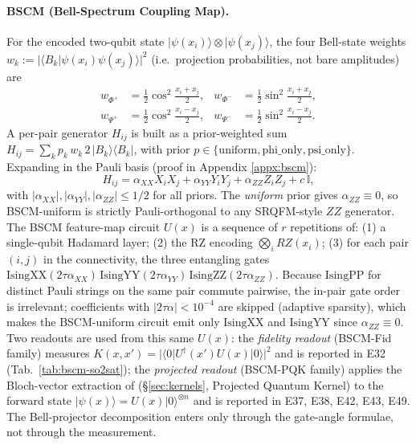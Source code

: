 \documentclass[pdflatex,sn-mathphys]{sn-jnl}
\theoremstyle{plain}
\theoremstyle{remark}
\theoremstyle{definition}
\begin{document}
\paragraph{BSCM (Bell-Spectrum Coupling Map).}\label{sec:bscm}
For the encoded two-qubit state $|\psi(x_i)\rangle\!\otimes\!|\psi(x_j)\rangle$, the four Bell-state weights $w_k := |\langle B_k | \psi(x_i)\psi(x_j)\rangle|^2$ (i.e.\ projection probabilities, not bare amplitudes) are
\begin{align*}
w_{\Phi^+}&=\tfrac12\cos^2\!\tfrac{x_i+x_j}{2}, &
w_{\Phi^-}&=\tfrac12\sin^2\!\tfrac{x_i+x_j}{2},\\
w_{\Psi^+}&=\tfrac12\cos^2\!\tfrac{x_i-x_j}{2}, &
w_{\Psi^-}&=\tfrac12\sin^2\!\tfrac{x_i-x_j}{2}.
\end{align*}
A per-pair generator $H_{ij}$ is built as a prior-weighted sum $H_{ij}=\sum_k p_k\,w_k\,2\,|B_k\rangle\!\langle B_k|$, with prior $p\in\{\text{uniform},\text{phi\_only},\text{psi\_only}\}$. Expanding in the Pauli basis (proof in Appendix \ref{appx:bscm}):
\begin{equation}\label{eq:pauli}
H_{ij} = \alpha_{XX}X_iX_j + \alpha_{YY}Y_iY_j + \alpha_{ZZ}Z_iZ_j + c\,\mathbb{I},
\end{equation}
with $|\alpha_{XX}|,|\alpha_{YY}|,|\alpha_{ZZ}|\le 1/2$ for all priors. The \emph{uniform} prior gives $\alpha_{ZZ}\!\equiv\!0$, so BSCM-uniform is strictly Pauli-orthogonal to any SRQFM-style $ZZ$ generator.
The BSCM feature-map circuit $U(x)$ is a sequence of $r$ repetitions of: (1) a single-qubit Hadamard layer; (2) the RZ encoding $\bigotimes_i RZ(x_i)$; (3) for each pair $(i,j)$ in the connectivity, the three entangling gates $\mathrm{IsingXX}(2\tau\alpha_{XX})\,\mathrm{IsingYY}(2\tau\alpha_{YY})\,\mathrm{IsingZZ}(2\tau\alpha_{ZZ})$.  Because $\mathrm{IsingPP}$ for distinct Pauli strings on the same pair commute pairwise, the in-pair gate order is irrelevant; coefficients with $|2\tau\alpha|<10^{-4}$ are skipped (adaptive sparsity), which makes the BSCM-uniform circuit emit only $\mathrm{IsingXX}$ and $\mathrm{IsingYY}$ since $\alpha_{ZZ}\!\equiv\!0$.  Two readouts are used from this same $U(x)$: the \emph{fidelity readout} (BSCM-Fid family) measures $K(x,x')=|\langle 0|U^\dagger(x')U(x)|0\rangle|^2$ and is reported in E32 (Tab.~\ref{tab:bscm-so2sat}); the \emph{projected readout} (BSCM-PQK family) applies the Bloch-vector extraction of (\S\ref{sec:kernels}, Projected Quantum Kernel) to the forward state $|\psi(x)\rangle = U(x)|0\rangle^{\otimes n}$ and is reported in E37, E38, E42, E43, E49.  The Bell-projector decomposition enters only through the gate-angle formulae, not through the measurement.
\end{document}
